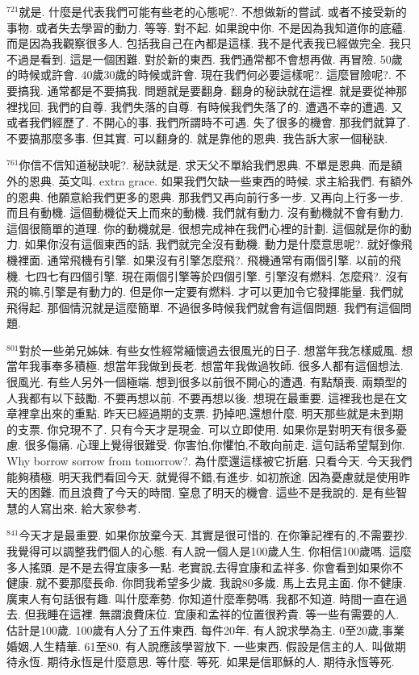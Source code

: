 \documentclass{book}
\begin{document}
$^{721}$就是.
什麼是代表我們可能有些老的心態呢?.
不想做新的嘗試.
或者不接受新的事物.
或者失去學習的動力.
等等.
對不起.
如果說中你.
不是因為我知道你的底蘊.
而是因為我觀察很多人.
包括我自己在內都是這樣.
我不是代表我已經做完全.
我只不過是看到.
這是一個困難.
對於新的東西.
我們通常都不會想再做.
再冒險.
50歲的時候或許會.
40歲30歲的時候或許會.
現在我們何必要這樣呢?.
這麼冒險呢?.
不要搞我.
通常都是不要搞我.
問題就是要翻身.
翻身的秘訣就在這裡.
就是要從神那裡找回.
我們的自尊.
我們失落的自尊.
有時候我們失落了的.
遭遇不幸的遭遇.
又或者我們經歷了.
不開心的事.
我們所謂時不可遇.
失了很多的機會.
那我們就算了.
不要搞那麼多事.
但其實.
可以翻身的.
就是靠他的恩典.
我告訴大家一個秘訣.

$^{761}$你信不信知道秘訣呢?.
秘訣就是.
求天父不單給我們恩典.
不單是恩典.
而是額外的恩典.
英文叫.
extra grace.
如果我們欠缺一些東西的時候.
求主給我們.
有額外的恩典.
他願意給我們更多的恩典.
那我們又再向前行多一步.
又再向上行多一步.
而且有動機.
這個動機從天上而來的動機.
我們就有動力.
沒有動機就不會有動力.
這個很簡單的道理.
你的動機就是.
很想完成神在我們心裡的計劃.
這個就是你的動力.
如果你沒有這個東西的話.
我們就完全沒有動機.
動力是什麼意思呢?.
就好像飛機裡面.
通常飛機有引擎.
如果沒有引擎怎麼飛?.
飛機通常有兩個引擎.
以前的飛機.
七四七有四個引擎.
現在兩個引擎等於四個引擎.
引擎沒有燃料.
怎麼飛?.
沒有飛的嘛,引擎是有動力的.
但是你一定要有燃料.
才可以更加令它發揮能量.
我們就飛得起.
那個情況就是這麼簡單.
不過很多時候我們就會有這個問題.
我們有這個問題.

$^{801}$對於一些弟兄姊妹.
有些女性經常緬懷過去很風光的日子.
想當年我怎樣威風.
想當年我事奉多積極.
想當年我做到長老.
想當年我做過牧師.
很多人都有這個想法.
很風光.
有些人另外一個極端.
想到很多以前很不開心的遭遇.
有點頹喪.
兩類型的人我都有以下鼓勵.
不要再想以前.
不要再想以後.
想現在最重要.
這裡我也是在文章裡拿出來的重點.
昨天已經過期的支票.
扔掉吧,還想什麼.
明天那些就是未到期的支票.
你兌現不了.
只有今天才是現金.
可以立即使用.
如果你是對明天有很多憂慮.
很多傷痛.
心理上覺得很難受.
你害怕,你懼怕,不敢向前走.
這句話希望幫到你.
Why borrow sorrow from tomorrow?.
為什麼還這樣被它折磨.
只看今天.
今天我們能夠積極.
明天我們看回今天.
就覺得不錯,有進步.
如初旅途.
因為憂慮就是使用昨天的困難.
而且浪費了今天的時間.
窒息了明天的機會.
這些不是我說的.
是有些智慧的人寫出來.
給大家參考.

$^{841}$今天才是最重要.
如果你放棄今天.
其實是很可惜的.
在你筆記裡有的,不需要抄.
我覺得可以調整我們個人的心態.
有人說一個人是100歲人生.
你相信100歲嗎.
這麼多人搖頭.
是不是去得宜康多一點.
老實說,去得宜康和孟祥多.
你會看到如果你不健康.
就不要那麼長命.
你問我希望多少歲.
我說80多歲.
馬上去見主面.
你不健康.
廣東人有句話很有趣.
叫什麼牽勢.
你知道什麼牽勢嗎.
我都不知道.
時間一直在過去.
但我睡在這裡.
無謂浪費床位.
宜康和孟祥的位置很矜貴.
等一些有需要的人.
估計是100歲.
100歲有人分了五件東西.
每件20年.
有人說求學為主.
0至20歲,事業婚姻,人生精華.
61至80.
有人說應該學習放下.
一些東西.
假設是信主的人.
叫做期待永恆.
期待永恆是什麼意思.
等什麼.
等死.
如果是信耶穌的人.
期待永恆等死.
\end{document}
